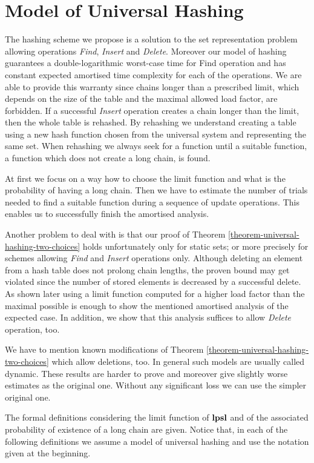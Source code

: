 \section{Model of Universal Hashing}
The hashing scheme we propose is a solution to the set representation problem allowing operations \emph{Find}, \emph{Insert} and \emph{Delete}. Moreover our model of hashing guarantees a double-logarithmic worst-case time for Find operation and has constant expected amortised time complexity for each of the operations. We are able to provide this warranty since chains longer than a prescribed limit, which depends on the size of the table and the maximal allowed load factor, are forbidden. If a successful \emph{Insert} operation creates a chain longer than the limit, then the whole table is rehashed. By rehashing we understand creating a table using a new hash function chosen from the universal system and representing the same set. When rehashing we always seek for a function until a suitable function, a function which does not create a long chain, is found. 

At first we focus on a way how to choose the limit function and what is the probability of having a long chain. Then we have to estimate the number of trials needed to find a suitable function during a sequence of update operations. This enables us to successfully finish the amortised analysis.

Another problem to deal with is that our proof of Theorem \ref{theorem-universal-hashing-two-choices} holds unfortunately only for static sets; or more precisely for schemes allowing \emph{Find} and \emph{Insert} operations only. Although deleting an element from a hash table does not prolong chain lengths, the proven bound may get violated since the number of stored elements is decreased by a successful delete. As shown later using a limit function computed for a higher load factor than the maximal possible is enough to show the mentioned amortised analysis of the expected case. In addition, we show that this analysis suffices to allow \emph{Delete} operation, too. 

We have to mention known modifications of Theorem \ref{theorem-universal-hashing-two-choices} which allow deletions, too. In general such models are usually called dynamic. These results are harder to prove and moreover give slightly worse estimates as the original one. Without any significant loss we can use the simpler original one.

The formal definitions considering the limit function of $\mathbf{lpsl}$ and of the associated probability of existence of a long chain are given. Notice that, in each of the following definitions we assume a model of universal hashing and use the notation given at the beginning.

